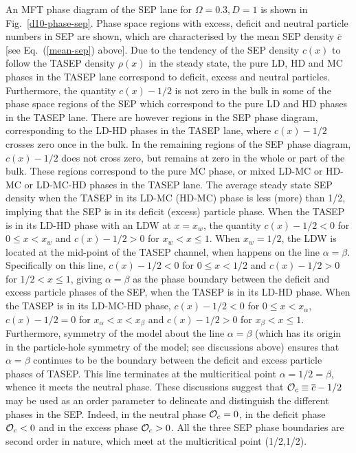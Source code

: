 \documentclass[aps,pre,twocolumn,superscriptaddress,amsmath,amssymb,longbibliography,floatfix,nofootinbib]{revtex4}
\begin{document}
{An MFT phase diagram of the SEP lane for $\Omega=0.3, D=1$ is shown in Fig.~\ref{d10-phase-sep}. Phase space regions with excess, deficit and neutral particle numbers in SEP are shown, which are characterised by the mean SEP density $\overline c$ [see Eq.~(\ref{mean-sep}) above]. Due to the tendency of the SEP density $c(x)$ to follow the TASEP density $\rho(x)$ in the steady state, the pure LD, HD and MC phases in the TASEP lane correspond to deficit, excess and neutral particles. Furthermore, the quantity $c(x)-1/2$ is not zero in the bulk in some of the phase space regions of the SEP which correspond to the pure LD and HD phases  in the TASEP lane. There are however regions in the SEP phase diagram, corresponding to the LD-HD phases in the TASEP lane, where $c(x)-1/2$ crosses zero once in the bulk. In the remaining regions of the SEP phase diagram, $c(x)-1/2$ does not cross zero, but remains at zero in the whole or part of the bulk. These regions correspond to the pure MC phase, or mixed LD-MC or HD-MC or LD-MC-HD phases in the TASEP lane. The average steady state SEP density when the TASEP in its LD-MC (HD-MC) phase is less (more) than 1/2, implying that the SEP is in its deficit (excess) particle phase. When the TASEP is in its LD-HD phase with an LDW at $x=x_w$, the quantity $c(x)-1/2<0$ for $0\leq x< x_w$ and $c(x)-1/2>0$ for $x_w< x\leq 1$. When $x_w=1/2$, the LDW is located at the mid-point of the TASEP channel, when happens on the line $\alpha =\beta$. Specifically on this line,  $c(x)-1/2<0$ for $0\leq x< 1/2$ and $c(x)-1/2>0$ for $1/2< x\leq 1$, giving $\alpha=\beta$ as the phase boundary between the deficit and excess particle phases of the SEP, when the TASEP is in its LD-HD phase. When the TASEP is in its LD-MC-HD phase, $c(x)-1/2<0$ for $0\leq x<x_\alpha$, $c(x)-1/2=0$ for $x_\alpha<x<x_\beta$ and  $c(x)-1/2>0$ for $x_\beta<x\leq 1$. Furthermore, symmetry of the model about the line $\alpha=\beta$ (which has its origin in the particle-hole symmetry of the model; see discussions above) ensures that  $\alpha=\beta$ continues to be the boundary between the deficit and excess particle phases of TASEP. This line terminates at the multicritical point $\alpha=1/2=\beta$, whence it meets the neutral phase. These discussions suggest that ${\cal O}_c\equiv \overline c-1/2$ may be used as an order parameter to delineate and distinguish the different phases in the SEP. Indeed, in the neutral phase ${\cal O}_c=0$, in the deficit phase ${\cal O}_c<0$ and in the excess phase ${\cal O}_c>0$.  All the three SEP phase boundaries are second order in nature, which meet at the multicritical point (1/2,1/2).

}
\end{document}

